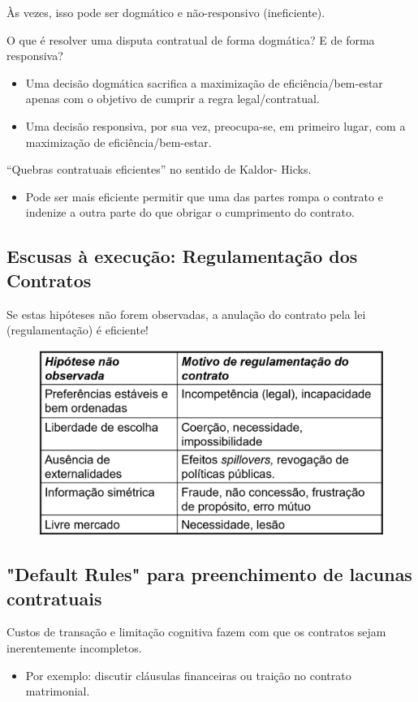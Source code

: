 \documentclass[a4paper,12pt]{article}[abntex2]
\begin{document}
Às vezes, isso pode ser dogmático e não-responsivo (ineficiente).

O que é resolver uma disputa contratual de forma dogmática? E de forma responsiva?\begin{itemize}
    \item Uma decisão dogmática sacrifica a maximização de eficiência/bem-estar apenas com o objetivo de cumprir a regra legal/contratual.
    \item Uma decisão responsiva, por sua vez, preocupa-se, em primeiro lugar, com a maximização de eficiência/bem-estar.
\end{itemize}

“Quebras contratuais eficientes” no sentido de Kaldor- Hicks. \begin{itemize}
    \item Pode ser mais eficiente permitir que uma das partes rompa o contrato e indenize a outra parte do que obrigar o cumprimento do contrato.
\end{itemize}

\subsection{\textbf{Escusas à execução: Regulamentação dos Contratos}}
Se estas hipóteses não forem observadas, a anulação do contrato pela lei (regulamentação) é eficiente!

\begin{figure}[H]
    \centering
    \includegraphics[width=0.7\linewidth]{Imagens/a10i7.png}
\end{figure}

\subsection{\textbf{"Default Rules" para preenchimento de lacunas contratuais}}
Custos de transação e limitação cognitiva fazem com que os contratos sejam inerentemente incompletos.\begin{itemize} 
    \item Por exemplo: discutir cláusulas financeiras ou traição no contrato matrimonial.
\end{itemize}
\end{document}
